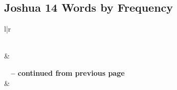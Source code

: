 

\subsection{Joshua 14 Words by Frequency}


\normalsize
 
\begin{center}
\begin{longtable}{l|r}
\caption[Joshua 14 Words by Frequency]{Joshua 14 Words by Frequency}\label{table:WordsbyFrequency for Joshua 14} \\
\hline {} &  \\ \hline 
\endfirsthead
 
{{\bfseries \tablename\ \thetable{} -- continued from previous page}} \\  
\hline {} &  \\ \hline 
\endhead
 

\end{longtable}
\end{center}
